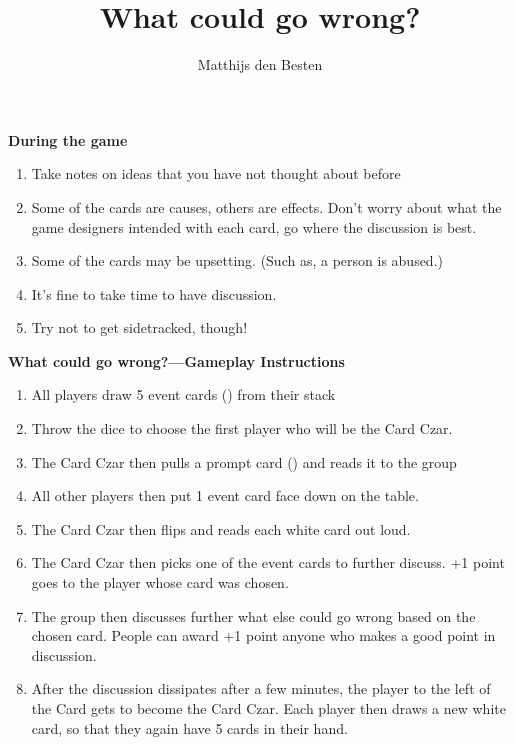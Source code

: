 \documentclass[grid,avery5371]{flashcards}
\title{What could go wrong?}
\author{Matthijs den Besten}
\begin{document}

\begin{flashcard}{
{\bf\small During the game}
\begin{multicols}{2}
\begin{enumerate}\tiny \setlength{\itemsep}{.5ex}
    \item Take notes on ideas that you have not thought about before
    \item Some of the cards are causes, others are effects. Don’t worry about what the game designers intended with each card, go where the discussion is best.
    \item Some of the cards may be upsetting. (Such as, a person is abused.)
    \item It’s fine to take time to have discussion.
    \item Try not to get sidetracked, though!
\end{enumerate}
\end{multicols}
}
{\bf\small What could go wrong?---Gameplay Instructions}
\begin{multicols}{2}
    \begin{enumerate}\tiny \setlength\itemsep{.2ex}
        \item All players draw 5 event cards () from their stack
        \item Throw the dice to choose the first player who will be the Card Czar.
        \item The Card Czar then pulls a prompt card () and reads it to the group
        \item All other players then put 1 event card face down on the table.   
        \item The Card Czar then flips and reads each white card out loud.
        \item The Card Czar then picks one of the event cards to further discuss. +1 point goes to the player whose card was chosen.
        \item The group then discusses further what else could go wrong based on the chosen card. People can award +1 point anyone who makes a good point in discussion.
        \item After the discussion dissipates after a few minutes, the player to the left of the Card gets to become the Card Czar. Each player then draws a new white card, so that they again have 5 cards in their hand.
    \end{enumerate}
    \end{multicols}
\end{flashcard}
\end{document}
